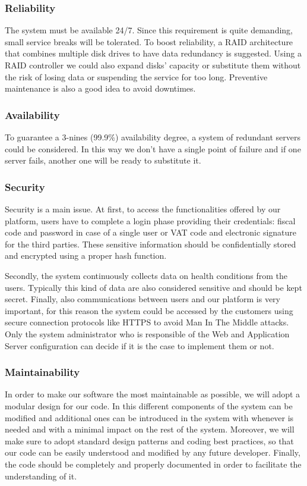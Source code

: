 \subsubsection{Reliability}
The system must be available 24/7. Since this requirement is quite demanding, small service breaks will be tolerated. To boost reliability, a RAID architecture that combines multiple disk drives to have data redundancy is suggested. Using a RAID controller we could also expand disks' capacity or substitute them without the risk of losing data or suspending the service for too long. Preventive maintenance is also a good idea to avoid downtimes.

\subsubsection{Availability}
To guarantee a 3-nines (99.9\%) availability degree, a system of redundant servers could be considered. In this way we don't have a single point of failure and if one server fails, another one will be ready to substitute it.

\subsubsection{Security}
Security is a main issue.  At first, to access the functionalities offered by our platform, users have to complete a login phase providing their credentials: fiscal code and password in case of a single user or VAT code and electronic signature for the third parties. These sensitive information should be confidentially stored and encrypted using a proper hash function.

Secondly, the system  continuously collects data on health conditions from the users. Typically this kind of data are also considered sensitive and should be kept secret. Finally, also communications between users and our platform is very important, for this reason the system could be accessed by the customers using secure connection protocols like HTTPS to avoid Man In The Middle attacks. Only the system administrator who is responsible of the Web and Application Server configuration can decide if it is the case to implement them or not.

\subsubsection{Maintainability}
In order to make our software the most maintainable as possible, we will adopt a modular design for our code. In this different components of the system can be modified and additional ones can be introduced in the system with whenever is needed and with a minimal impact on the rest of the system.
Moreover, we will make sure to adopt standard design patterns and coding best practices, so that our code can be easily understood and modified by any future developer.
Finally, the code should be completely and properly documented in order to facilitate the understanding of it. 


